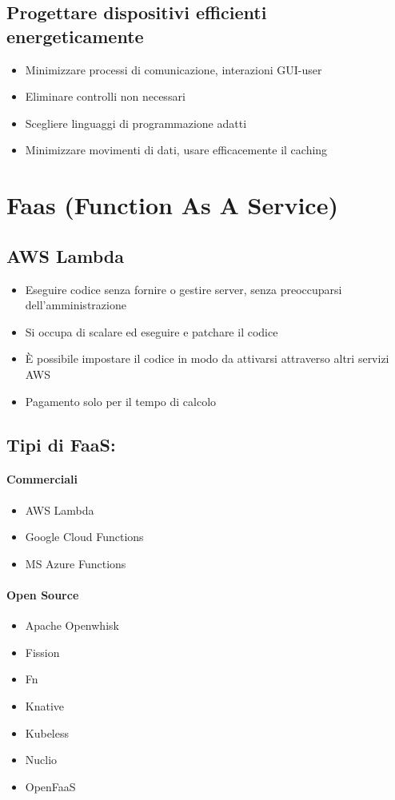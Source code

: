\documentclass[a4paper, 12pt]{report}
\begin{document}
      \section{Progettare dispositivi efficienti energeticamente}
        \begin{itemize}
          \item Minimizzare processi di comunicazione, interazioni GUI-user
          \item Eliminare controlli non necessari
          \item Scegliere linguaggi di programmazione adatti
          \item Minimizzare movimenti di dati, usare efficacemente il caching
        \end{itemize}
    \chapter{Faas (Function As A Service)}
        \section{AWS Lambda}
          \begin{itemize}
            \item Eseguire codice senza fornire o gestire server, senza preoccuparsi dell'amministrazione
            \item Si occupa di scalare ed eseguire e patchare il codice
            \item È possibile impostare il codice in modo da attivarsi attraverso altri servizi AWS
            \item Pagamento solo per il tempo di calcolo
          \end{itemize}
        \clearpage
          \section{Tipi di FaaS:}
          \subsubsection{Commerciali}
          \begin{itemize}
            \item AWS Lambda
            \item Google Cloud Functions
            \item MS Azure Functions
          \end{itemize}
          \subsubsection{Open Source}
          \begin{itemize}
            \item Apache Openwhisk
            \item Fission
            \item Fn
            \item Knative
            \item Kubeless
            \item Nuclio
            \item OpenFaaS
          \end{itemize}
\end{document}
